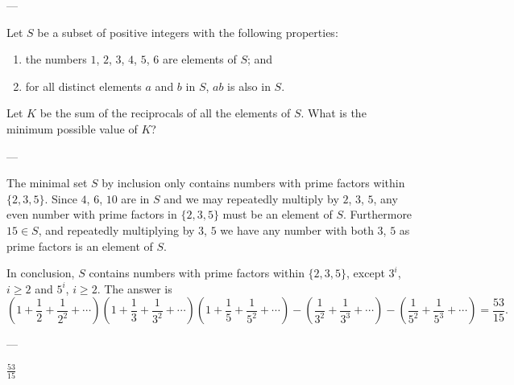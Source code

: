 
---

Let $S$ be a subset of positive integers with the following properties:
\begin{enumerate}[label=(\roman*),itemsep=0em]
    \item the numbers $1$, $2$, $3$, $4$, $5$, $6$ are elements of $S$; and
    \item for all distinct elements $a$ and $b$ in $S$, $ab$ is also in $S$.
\end{enumerate}
Let $K$ be the sum of the reciprocals of all the elements of $S$. What is the minimum possible value of $K$?

---

The minimal set $S$ by inclusion only contains numbers with prime factors within $\{2,3,5\}$. Since $4$, $6$, $10$ are in $S$ and we may repeatedly multiply by $2$, $3$, $5$, any even number with prime factors in $\{2,3,5\}$ must be an element of $S$. Furthermore $15\in S$, and repeatedly multiplying by $3$, $5$ we have any number with both $3$, $5$ as prime factors is an element of $S$.

In conclusion, $S$ contains numbers with prime factors within $\{2,3,5\}$, except $3^i$, $i\ge2$ and $5^i$, $i\ge2$. The answer is \[\left(1+\frac12+\frac1{2^2}+\cdots\right)\left(1+\frac13+\frac1{3^2}+\cdots\right)\left(1+\frac15+\frac1{5^2}+\cdots\right)-\left(\frac1{3^2}+\frac1{3^3}+\cdots\right)-\left(\frac1{5^2}+\frac1{5^3}+\cdots\right)=\frac{53}{15}.\]

---

$\frac{53}{15}$
